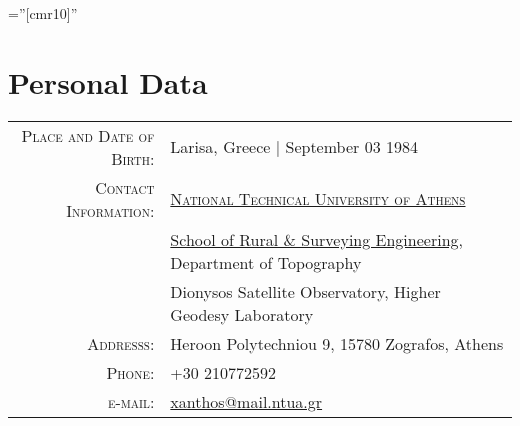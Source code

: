 \documentclass[a4paper,10pt]{article} %
\begin{document}
\pagestyle{empty} %
\font\fb=''[cmr10]'' %


\par{\bigskip\par} %

\section{Personal Data}

\begin{tabular}{rl}
  \textsc{Place and Date of Birth:} & Larisa, Greece | September 03 1984\\
  \textsc{Contact Information:}
  & \textsc{\href{http://www.ntua.gr/}{National Technical University of Athens}} \\
  & \href{http://www.survey.ntua.gr/}{School of Rural \& Surveying Engineering}, Department of Topography\\
  & Dionysos Satellite Observatory, Higher Geodesy Laboratory \\
  \textsc{Addresss:} & Heroon Polytechniou 9, 15780 Zografos, Athens\\
  \textsc{Phone:} & +30 210772592\\
  \textsc{e-mail:} & \href{mailto:xanthos@mail.ntua.gr}{xanthos@mail.ntua.gr}
\end{tabular}
\medskip

\end{document}
